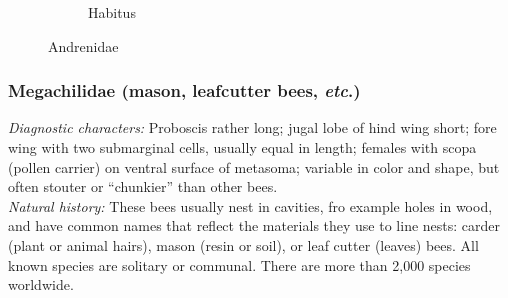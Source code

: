 \documentclass[letterpaper, 11pt]{article}
\begin{document}
\begin{figure}[ht!]
\begin{subfigure}[ht!]{0.37\textwidth}
        \caption{Habitus \citep[][Fig. 116]{goulet1993hymenoptera}}
        \label{fig:andrenid2}
    \end{subfigure}
    \caption{Andrenidae}\label{fig:andrenids}
\end{figure}

\subsubsection{Megachilidae (mason, leafcutter bees, \textit{etc}.)}
\noindent{}\textit{Diagnostic characters:} Proboscis rather long; jugal lobe of hind wing short; fore wing with two submarginal cells, usually equal in length; females with scopa (pollen carrier) on ventral surface of metasoma; variable in color and shape, but often stouter or ``chunkier'' than other bees.\\

\noindent{}\textit{Natural history:} These bees usually nest in cavities, fro example holes in wood, and have common names that reflect the materials they use to line nests: carder (plant or animal hairs), mason (resin or soil), or leaf cutter (leaves) bees. All known species are solitary or communal. There are more than 2,000 species worldwide.\\
\end{document}

